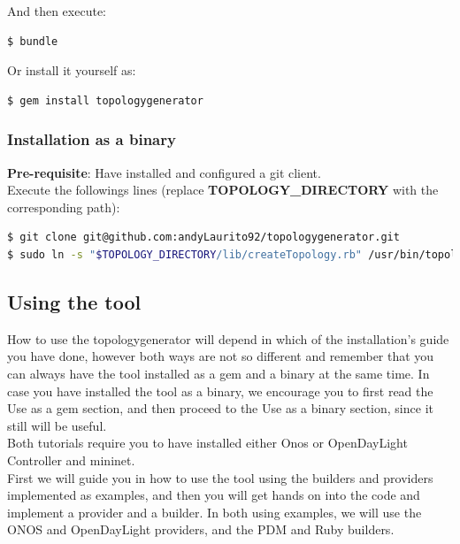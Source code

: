 And then execute:

\begin{lstlisting}[language=bash,breaklines=true]
$ bundle
\end{lstlisting}

Or install it yourself as: 

\begin{lstlisting}[language=bash,breaklines=true]
$ gem install topologygenerator
\end{lstlisting}

\subsubsection{Installation as a binary}

\textbf{Pre-requisite}: Have installed and configured a git client. \\

Execute the followings lines (replace \textbf{TOPOLOGY\_DIRECTORY} with the corresponding path):

\begin{lstlisting}[language=bash,breaklines=true]
$ git clone git@github.com:andyLaurito92/topologygenerator.git
$ sudo ln -s "$TOPOLOGY_DIRECTORY/lib/createTopology.rb" /usr/bin/topologygenerator
\end{lstlisting}

\subsection{Using the tool}

How to use the topologygenerator will depend in which of the installation's guide you have done, however both ways are not so different and remember that you can always have the tool installed as a gem and a binary at the same time. In case you have installed the tool as a binary, we encourage you to first read the Use as a gem section, and then proceed to the Use as a binary section, since it still will be useful. \\
Both tutorials require you to have installed either Onos or OpenDayLight Controller and mininet. \\
First we will guide you in how to use the tool using the builders and providers implemented as examples, and then you will get hands on into the code and implement a provider and a builder. In both using examples, we will use the ONOS and OpenDayLight providers, and the PDM and Ruby builders. \\

